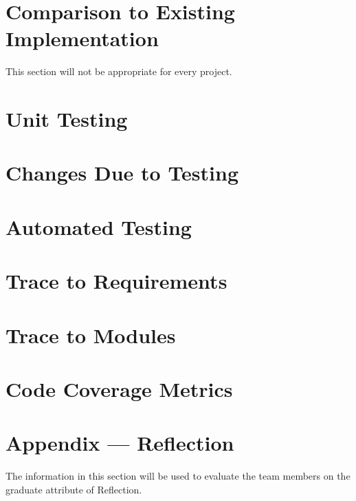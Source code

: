 \documentclass[12pt, titlepage]{article}
\begin{document}
\section{Comparison to Existing Implementation}	

This section will not be appropriate for every project.

\section{Unit Testing}

\section{Changes Due to Testing}


\section{Automated Testing}
		
\section{Trace to Requirements}
		
\section{Trace to Modules}		

\section{Code Coverage Metrics}




\newpage{}
\section*{Appendix --- Reflection}

The information in this section will be used to evaluate the team members on the
graduate attribute of Reflection.


\end{document}
